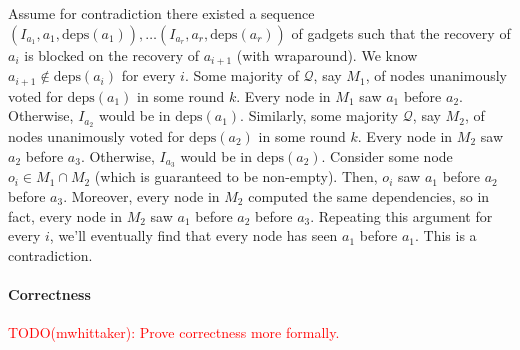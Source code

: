 \documentclass{mwhittaker}
\theoremstyle{definition}
\newcommand{\todo}[2]{\textcolor{red}{TODO(#1): #2}}
\newcommand{\deps}[1]{\text{deps}(#1)}
\begin{document}
Assume for contradiction there existed a sequence
$
  (I_{a_1}, a_1, \deps{a_1}),
  \ldots
  (I_{a_r}, a_r, \deps{a_r})
$
of gadgets such that the recovery of $a_i$ is blocked on the recovery of
$a_{i+1}$ (with wraparound). We know $a_{i+1} \notin \deps{a_i}$ for every $i$.
%
Some majority of $\mathcal{Q}$, say $M_1$, of nodes unanimously voted for
$\deps{a_1}$ in some round $k$. Every node in $M_1$ saw $a_1$ before $a_2$.
Otherwise, $I_{a_2}$ would be in $\deps{a_1}$.
%
Similarly, some majority $\mathcal{Q}$, say $M_2$, of nodes unanimously voted
for $\deps{a_2}$ in some round $k$. Every node in $M_2$ saw $a_2$ before $a_3$.
Otherwise, $I_{a_3}$ would be in $\deps{a_2}$.
%
Consider some node $o_i \in M_1 \cap M_2$ (which is guaranteed to be
non-empty). Then, $o_i$ saw $a_1$ before $a_2$ before $a_3$. Moreover, every
node in $M_2$ computed the same dependencies, so in fact, every node in $M_2$
saw $a_1$ before $a_2$ before $a_3$. Repeating this argument for every $i$,
we'll eventually find that every node has seen $a_1$ before $a_1$. This is a
contradiction.

\paragraph{Correctness}
\todo{mwhittaker}{Prove correctness more formally.}



\end{document}
